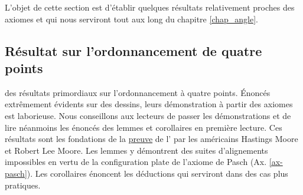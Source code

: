     L'objet de cette section est d'établir quelques résultats relativement proches des axiomes et qui nous serviront tout aux long du chapitre \ref{chap_angle}.



        \subsection{Résultat sur l'ordonnancement de quatre points}\label{subsec-quatrepoints}


 des résultats primordiaux sur l'ordonnancement à quatre points. Énoncés extrêmement évidents sur des dessins, leurs démonstration à partir des axiomes est laborieuse. Nous conseillons aux lecteurs de passer les démonstrations et de lire néanmoins les énoncés des lemmes et corollaires en première lecture.  Ces résultats sont les fondations de la \href{https://www.ams.org/journals/tran/1902-003-01/S0002-9947-1902-1500592-8/S0002-9947-1902-1500592-8.pdf}{preuve} de l' par les américains Hastings Moore et Robert Lee Moore. Les lemmes y démontrent des suites d'alignements impossibles en vertu de la configuration plate de l'axiome de Pasch (Ax. \ref{ax-pasch}). Les corollaires énoncent les déductions qui serviront dans des cas plus pratiques.



